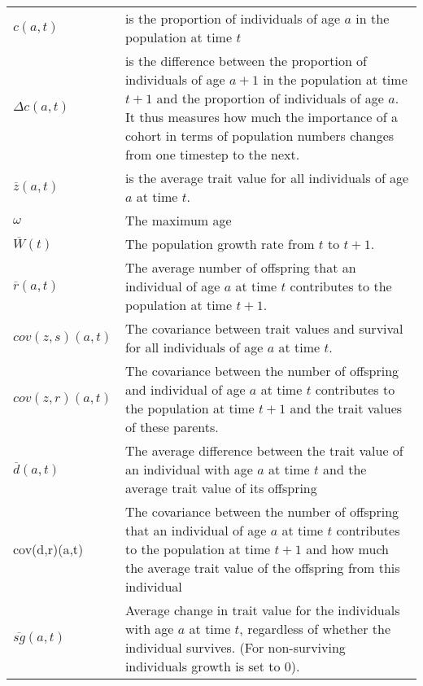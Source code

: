 \begin{tabular}{l p{}}
$c(a,t)$ & is the proportion of individuals of age $a$ in the population at time $t$ \\
$\Delta c(a,t)$ & is the difference between the proportion of individuals of age $a+1$ in the population at time $t+1$ and the proportion of individuals of age $a$. It thus measures how much the importance of a cohort in terms of population numbers changes from one timestep to the next.  \\
$\overline{z}(a,t)$ & is the average trait value for all individuals of age $a$ at time $t$.\\
$\omega$ & The maximum age\\
$\overline{W}(t)$ & The population growth rate from $t$ to $t+1$.\\
$\overline{r}(a,t)$ & The average number of offspring that an individual of age $a$ at time $t$ contributes to the population at time $t+1$.\\
$cov(z,s)(a,t)$ & The covariance between trait values and survival for all individuals of age $a$ at time $t$.\\
$cov(z,r)(a,t)$ & The covariance between the number of offspring and individual of age $a$ at time $t$ contributes to the population at time $t+1$ and the trait values of these parents.\\
$\overline{d}(a,t)$ & The average difference between the trait value of an individual with age $a$ at time $t$ and the average trait value of its offspring  \\
cov(d,r)(a,t) & The covariance between the number of offspring that an individual of age $a$ at time $t$ contributes to the population at time $t+1$ and how much the average trait value of the offspring from this individual \\
$\overline{sg}(a,t)$ & Average change in trait value for the individuals with age $a$ at time $t$, regardless of whether the individual survives. (For non-surviving individuals growth is set to 0).\\
\end{tabular}
